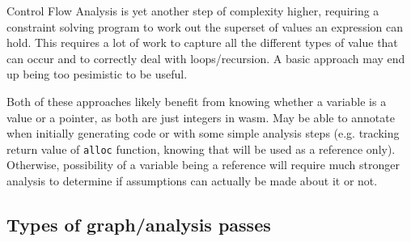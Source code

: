\documentclass[10pt,twoside,a4paper]{article}
\begin{document}
Control Flow Analysis is yet another step of complexity higher, requiring a constraint solving program to work out the superset of values an expression can hold. This requires a lot of work to capture all the different types of value that can occur and to correctly deal with loops/recursion. A basic approach may end up being too pesimistic to be useful.

Both of these approaches likely benefit from knowing whether a variable is a value or a pointer, as both are just integers in wasm. May be able to annotate when initially generating code or with some simple analysis steps (e.g. tracking return value of \verb|alloc| function, knowing that will be used as a reference only). Otherwise, possibility of a variable being a reference will require much stronger analysis to determine if assumptions can actually be made about it or not.

\subsection*{Types of graph/analysis passes}
\end{document}
